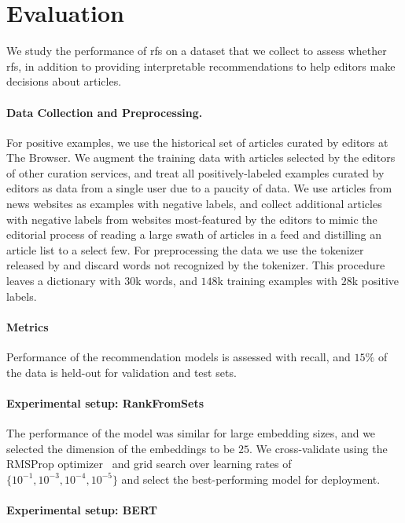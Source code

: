 \section{Evaluation}
\label{sec:experiments}

We study the performance of \acrlong{rfs} on a dataset that we collect to assess whether \gls{rfs}, in addition to providing interpretable recommendations to help editors make decisions about articles.

\paragraph{Data Collection and Preprocessing.} For positive examples, we use the historical set of articles curated by editors at The Browser. We augment the training data with articles selected by the editors of other curation services, and treat all positively-labeled examples curated by editors as data from a single user due to a paucity of data. We use articles from news websites as examples with negative labels, and collect additional articles with negative labels from websites most-featured by the editors to mimic the editorial process of reading a large swath of articles in a feed and distilling an article list to a select few. For preprocessing the data we use the tokenizer released by \citet{devlin2019bert:} and discard words not recognized by the tokenizer. This procedure leaves a dictionary with $30$k words, and $148$k training examples with $28$k positive labels.

\paragraph{Metrics} Performance of the recommendation models is assessed with recall, and $15\%$ of the data is held-out for validation and test sets.

\paragraph{Experimental setup: RankFromSets} The performance of the model was similar for large embedding sizes, and we selected the dimension of the embeddings to be $25$. We cross-validate using the RMSProp optimizer~\citep{tieleman2012lecture} and grid search over learning rates of $\{10^{-1}, 10^{-3}, 10^{-4}, 10^{-5}\}$ and select the best-performing model for deployment.

\paragraph{Experimental setup: BERT}


